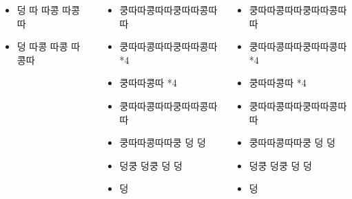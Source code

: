 \documentclass[20pt, a1paper ]{tikzposter}
\begin{document}
\begin{columns}
{\begin{Large}
\begin{itemize}
			\item 덩 따 따콩 따콩따
			\item 덩 따콩 따콩 따콩따

			\end{itemize}
			\end{Large}
		}


		{
			\setlength{\leftmargini}{2em}			
			\setlength{\labelsep}{1em} 
			\begin{Large}
			\begin{itemize}

			\item 쿵따따콩따따쿵따따콩따따 
			\item 쿵따따콩따따쿵따따콩따 *4
			\item 쿵따따콩따 *4
			\item 쿵따따콩따따쿵따따콩따따 
			\item 쿵따따콩따따쿵 덩 덩
			\item 덩쿵 덩쿵 덩 덩
			\item 덩

			\end{itemize}
			\end{Large}
		}

		{
			\setlength{\leftmargini}{2em}			
			\setlength{\labelsep}{1em} 
			\begin{Large}
			\begin{itemize}

			\item 쿵따따콩따따쿵따따콩따따 
			\item 쿵따따콩따따쿵따따콩따 *4
			\item 쿵따따콩따 *4
			\item 쿵따따콩따따쿵따따콩따따 
			\item 쿵따따콩따따쿵 덩 덩
			\item 덩쿵 덩쿵 덩 덩
			\item 덩

			\end{itemize}
			\end{Large}
		}


	\end{columns}
\end{document}
